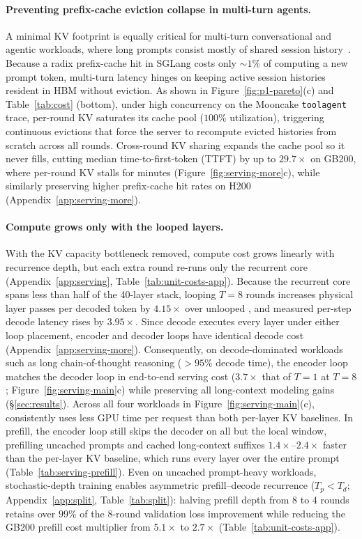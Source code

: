 \paragraph{Preventing prefix-cache eviction collapse in multi-turn agents.}
A minimal KV footprint is equally critical for multi-turn conversational and agentic workloads, where long prompts consist mostly of shared session history~\citep{mooncake,agentic_coding_wild}.
Because a radix prefix-cache hit in SGLang costs only $\sim\!1\%$ of computing a new prompt token, multi-turn latency hinges on keeping active session histories resident in HBM without eviction.
As shown in Figure~\ref{fig:p1-pareto}(c) and Table~\ref{tab:cost} (bottom), under high concurrency on the Mooncake \texttt{toolagent} trace, per-round KV saturates its cache pool ($100\%$ utilization), triggering continuous evictions that force the server to recompute evicted histories from scratch across all rounds.
Cross-round KV sharing expands the cache pool so it never fills, cutting median time-to-first-token (TTFT) by up to $\mathbf{29.7\times}$ on GB200, where per-round KV stalls for minutes (Figure~\ref{fig:serving-more}c), while similarly preserving higher prefix-cache hit rates on H200 (Appendix~\ref{app:serving-more}).


\paragraph{Compute grows only with the looped layers.}
With the KV capacity bottleneck removed, compute cost grows linearly with recurrence depth, but each extra round re-runs only the recurrent core (Appendix~\ref{app:serving}, Table~\ref{tab:unit-costs-app}).
Because the recurrent core spans less than half of the 40-layer stack, looping $T=8$ rounds increases physical layer passes per decoded token by $4.15\times$ over unlooped \ced, and measured per-step decode latency rises by $\mathbf{3.95\times}$.
Since decode executes every layer under either loop placement, encoder and decoder loops have identical decode cost (Appendix~\ref{app:serving-more}).
Consequently, on decode-dominated workloads such as long chain-of-thought reasoning ($>95\%$ decode time), the encoder loop matches the decoder loop in end-to-end serving cost ($\mathbf{3.7\times}$ that of $T=1$ at $T=8$; Figure~\ref{fig:serving-main}c) while preserving all long-context modeling gains (\S\ref{sec:results}).
Across all four workloads in Figure~\ref{fig:serving-main}(c), \ourmethod consistently uses less GPU time per request than both per-layer KV baselines.
In prefill, the encoder loop still skips the decoder on all but the local window, prefilling uncached prompts and cached long-context suffixes $\mathbf{1.4\times}$--$\mathbf{2.4\times}$ faster than the per-layer KV baseline, which runs every layer over the entire prompt (Table~\ref{tab:serving-prefill}).
Even on uncached prompt-heavy workloads, stochastic-depth training enables asymmetric prefill--decode recurrence ($T_p < T_d$; Appendix~\ref{app:split}, Table~\ref{tab:split}): halving prefill depth from $8$ to $4$ rounds retains over $99\%$ of the $8$-round validation loss improvement while reducing the GB200 prefill cost multiplier from $5.1\times$ to $\mathbf{2.7\times}$ (Table~\ref{tab:unit-costs-app}).

